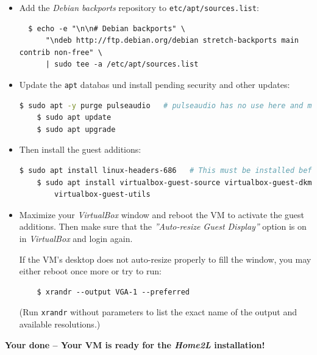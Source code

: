 \documentclass[12pt,english,parskip=half]{scrreprt}
\begin{document}
\begin{itemize}[$\blacktriangleright$]

\item
  Add the \emph{Debian backports} repository to \texttt{etc/apt/sources.list}:
  \begin{lstlisting}
  $ echo -e "\n\n# Debian backports" \
      "\ndeb http://ftp.debian.org/debian stretch-backports main contrib non-free" \
      | sudo tee -a /etc/apt/sources.list
  \end{lstlisting}

\item
  Update the \texttt{apt} databas und install pending security and other updates:
  \begin{lstlisting}[language=bash]
    $ sudo apt -y purge pulseaudio   # pulseaudio has no use here and may cause problems
    $ sudo apt update
    $ sudo apt upgrade
  \end{lstlisting}

\item
  Then install the guest additions:
  \begin{lstlisting}[language=bash]
    $ sudo apt install linux-headers-686   # This must be installed before!
    $ sudo apt install virtualbox-guest-source virtualbox-guest-dkms \
        virtualbox-guest-utils
  \end{lstlisting}

\item
  Maximize your \emph{VirtualBox} window and reboot the VM to activate the guest additions.
  Then make sure that the \emph{''Auto-resize Guest Display''} option is on in \emph{VirtualBox}
  and login again.

  If the VM's desktop does not auto-resize properly to fill the window, you may either
  reboot once more or try to run:
  \begin{lstlisting}
    $ xrandr --output VGA-1 --preferred
  \end{lstlisting}
  (Run \texttt{xrandr} without parameters to list the exact name of the output and available resolutions.)

\end{itemize}


\begin{center}
\textbf{Your done -- Your VM is ready for the \emph{Home2L} installation!}
\end{center}
\end{document}
